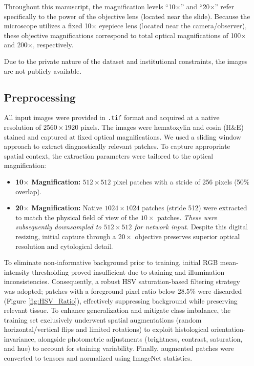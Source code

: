 \documentclass[conference]{IEEEtran}
\begin{document}
Throughout this manuscript, the magnification levels ``10$\times$'' and ``20$\times$'' refer specifically to the power of the objective lens (located near the slide). Because the microscope utilizes a fixed 10$\times$ eyepiece lens (located near the camera/observer), these objective magnifications correspond to total optical magnifications of 100$\times$ and 200$\times$, respectively.

Due to the private nature of the dataset and institutional constraints, the images are not publicly available.

\subsection{Preprocessing}
All input images were provided in \texttt{.tif} format and acquired at a native resolution of $2560 \times 1920$ pixels. 
The images were hematoxylin and eosin (H\&E) stained and captured at fixed optical magnifications.
We used a sliding window approach to extract diagnostically relevant patches. 
To capture appropriate spatial context, the extraction parameters were tailored to the optical magnification:
\begin{itemize}
    \item \textbf{10$\times$ Magnification:} $512 \times 512$ pixel patches with a stride of 256 pixels (50\% overlap).
    \item \textbf{20$\times$ Magnification:} Native $1024 \times 1024$ patches 
    (stride 512) were extracted to match the physical field of view of the $10\times$ 
    patches. \textit{These were subsequently downsampled to $512 \times 512$
     for network input.} Despite this digital resizing, initial capture through a 
     $20\times$ objective preserves superior optical resolution and cytological detail.
\end{itemize}

To eliminate non-informative background prior to training, initial RGB mean-intensity 
thresholding proved insufficient due to staining and illumination inconsistencies. 
Consequently, a robust HSV saturation-based filtering strategy was adopted; patches 
with a foreground pixel ratio below 28.5\% were discarded (Figure \ref{fig:HSV_Ratio}), 
effectively suppressing background while preserving relevant tissue. 
To enhance generalization and mitigate class imbalance, the training set exclusively 
underwent spatial augmentations (random horizontal/vertical flips and limited rotations) 
to exploit histological orientation-invariance, alongside photometric adjustments 
(brightness, contrast, saturation, and hue) to account for staining variability. 
Finally, augmented patches were converted to tensors and normalized using ImageNet 
statistics.
\end{document}
